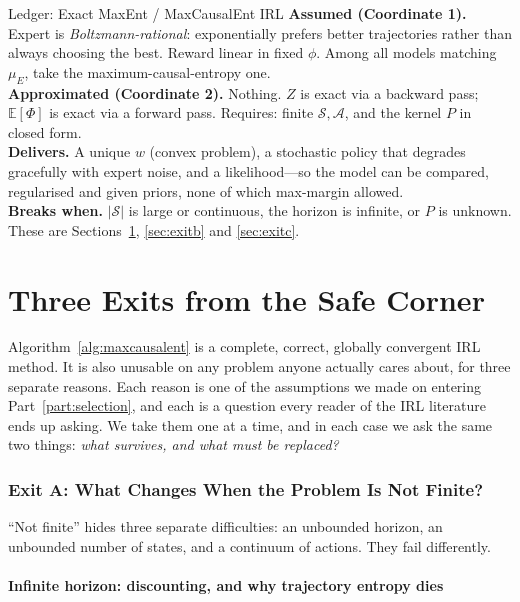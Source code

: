 \documentclass[11pt]{article}
\theoremstyle{plain}
\theoremstyle{definition}
\theoremstyle{remark}
\renewcommand{\S}{\mathcal{S}}
\newcommand{\A}{\mathcal{A}}
\newcommand{\E}{\mathbb{E}}
\begin{document}
\begin{navybox}{Ledger: Exact MaxEnt / MaxCausalEnt IRL}
\textbf{Assumed (Coordinate 1).} Expert is \emph{Boltzmann-rational}:
exponentially prefers better trajectories rather than always choosing the
best. Reward linear in fixed $\phi$. Among all models matching $\mu_E$,
take the maximum-causal-entropy one.\\
\textbf{Approximated (Coordinate 2).} Nothing. $Z$ is exact via a backward
pass; $\E[\Phi]$ is exact via a forward pass. Requires: finite $\S,\A$, and
the kernel $P$ in closed form.\\
\textbf{Delivers.} A unique $w$ (convex problem), a stochastic policy that
degrades gracefully with expert noise, and a likelihood---so the model can
be compared, regularised and given priors, none of which max-margin
allowed.\\
\textbf{Breaks when.} $|\S|$ is large or continuous, the horizon is
infinite, or $P$ is unknown. These are Sections~\ref{sec:exita},
\ref{sec:exitb} and \ref{sec:exitc}.
\end{navybox}

\clearpage
\part{Three Exits from the Safe Corner}\label{part:exits}

Algorithm~\ref{alg:maxcausalent} is a complete, correct, globally
convergent IRL method. It is also unusable on any problem anyone actually
cares about, for three separate reasons. Each reason is one of the
assumptions we made on entering Part~\ref{part:selection}, and each is a
question every reader of the IRL literature ends up asking. We take them
one at a time, and in each case we ask the same two things: \emph{what
survives, and what must be replaced?}

\section{Exit A: What Changes When the Problem Is Not Finite?}
\label{sec:exita}

``Not finite'' hides three separate difficulties: an unbounded horizon, an
unbounded number of states, and a continuum of actions. They fail
differently.

\subsection{Infinite horizon: discounting, and why trajectory entropy dies}
\end{document}
